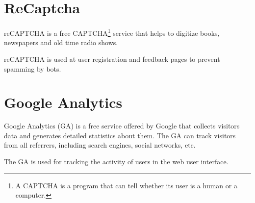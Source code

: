 \section{ReCaptcha}
\label{sec:reCaptcha}

\noindent
reCAPTCHA is a free CAPTCHA\footnote{A CAPTCHA is a program that can tell whether its user is a human or a computer.} service that helps to digitize books, newspapers and old time radio shows.

reCAPTCHA is used at user registration and feedback pages to prevent spamming by bots.



\section{Google Analytics}
\label{sec:ga}

\noindent
Google Analytics (GA) is a free service offered by Google that collects visitors data and generates detailed statistics about them.
The GA can track visitors from all referrers, including search engines, social networks, etc.

The GA is used for tracking the activity of users in the web user interface.





















